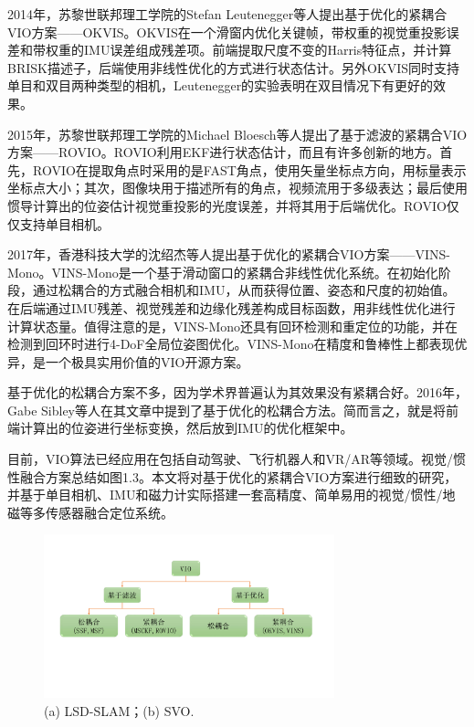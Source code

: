 2014年，苏黎世联邦理工学院的Stefan Leutenegger等人提出基于优化的紧耦合VIO方案——OKVIS。OKVIS在一个滑窗内优化关键帧，带权重的视觉重投影误差和带权重的IMU误差组成残差项。前端提取尺度不变的Harris特征点，并计算BRISK描述子，后端使用非线性优化的方式进行状态估计。另外OKVIS同时支持单目和双目两种类型的相机，Leutenegger的实验表明在双目情况下有更好的效果。

2015年，苏黎世联邦理工学院的Michael Bloesch等人提出了基于滤波的紧耦合VIO方案——ROVIO。ROVIO利用EKF进行状态估计，而且有许多创新的地方。首先，ROVIO在提取角点时采用的是FAST角点，使用矢量坐标点方向，用标量表示坐标点大小；其次，图像块用于描述所有的角点，视频流用于多级表达；最后使用惯导计算出的位姿估计视觉重投影的光度误差，并将其用于后端优化。ROVIO仅仅支持单目相机。

2017年，香港科技大学的沈绍杰等人提出基于优化的紧耦合VIO方案——VINS-Mono。VINS-Mono是一个基于滑动窗口的紧耦合非线性优化系统。在初始化阶段，通过松耦合的方式融合相机和IMU，从而获得位置、姿态和尺度的初始值。在后端通过IMU残差、视觉残差和边缘化残差构成目标函数，用非线性优化进行计算状态量。值得注意的是，VINS-Mono还具有回环检测和重定位的功能，并在检测到回环时进行4-DoF全局位姿图优化。VINS-Mono在精度和鲁棒性上都表现优异，是一个极具实用价值的VIO开源方案。

基于优化的松耦合方案不多，因为学术界普遍认为其效果没有紧耦合好。2016年，Gabe Sibley等人在其文章中提到了基于优化的松耦合方法。简而言之，就是将前端计算出的位姿进行坐标变换，然后放到IMU的优化框架中。

目前，VIO算法已经应用在包括自动驾驶、飞行机器人和VR/AR等领域。视觉/惯性融合方案总结如图1.3。本文将对基于优化的紧耦合VIO方案进行细致的研究，并基于单目相机、IMU和磁力计实际搭建一套高精度、简单易用的视觉/惯性/地磁等多传感器融合定位系统。

\begin{figure}[h]\setlength{\belowcaptionskip}{-12pt}
	\centering
	\includegraphics[width=0.75\textwidth]{figures/chapter1/fig1_3}
	\caption{(a) LSD-SLAM；(b) SVO.}\label{fig1_3}
\end{figure}


